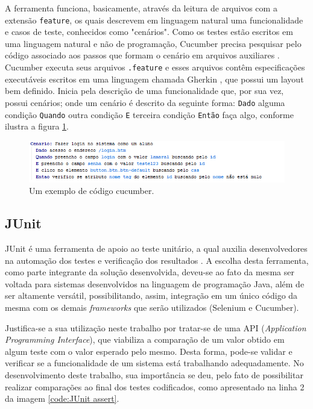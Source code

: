 \documentclass[tg]{mdtufsm}
\begin{document}
A ferramenta funciona, basicamente, através da leitura de arquivos com a extensão \texttt{feature}, os quais descrevem em linguagem natural uma funcionalidade e casos de teste, conhecidos como "cenários". Como os testes estão escritos em uma linguagem natural e não de programação, Cucumber precisa pesquisar pelo código associado aos passos que formam o cenário em arquivos auxiliares \cite{scmitzcucumberreview}. Cucumber
executa seus arquivos \texttt{.feature} e esses arquivos contêm especificações executáveis escritos em uma linguagem chamada Gherkin \cite{cucumberwiki}, que possui um layout bem definido. Inicia pela descrição de uma funcionalidade
que, por sua vez, possui cenários; onde um cenário é descrito da seguinte forma: \texttt{Dado} alguma condição \texttt{Quando} outra condição \texttt{E} terceira condição \texttt{Então} faça algo, conforme ilustra a figura \ref{fig:codigo_cucumber}.

\begin{figure}[!htb]
	\centering
	\includegraphics[width=1.1
	\textwidth]{codigo_cucumber}
	\caption{Um exemplo de código cucumber.}
	\label{fig:codigo_cucumber}
\end{figure}

\subsection{JUnit}
JUnit é uma ferramenta de apoio ao teste unitário, a qual auxilia desenvolvedores na automação dos testes e verificação dos resultados \cite{biasi2006geraccao}. A escolha desta ferramenta, como parte integrante da solução desenvolvida, deveu-se ao fato da mesma ser voltada para sistemas desenvolvidos na linguagem de programação Java, além de ser altamente versátil, possibilitando, assim, integração em um único código da mesma com os demais \emph{frameworks} que serão utilizados (Selenium e Cucumber).

Justifica-se a sua utilização neste trabalho por tratar-se de uma API (\emph{Application Programming Interface}), que viabiliza a comparação de um valor obtido em algum teste com o valor esperado pelo mesmo. Desta forma, pode-se validar e verificar se
a funcionalidade de um sistema está trabalhando adequadamente.
No desenvolvimento deste trabalho, sua importância se deu, pelo fato de possibilitar realizar comparações ao final dos testes codificados, como apresentado na linha 2 da imagem \ref{code:JUnit assert}.
\end{document}
